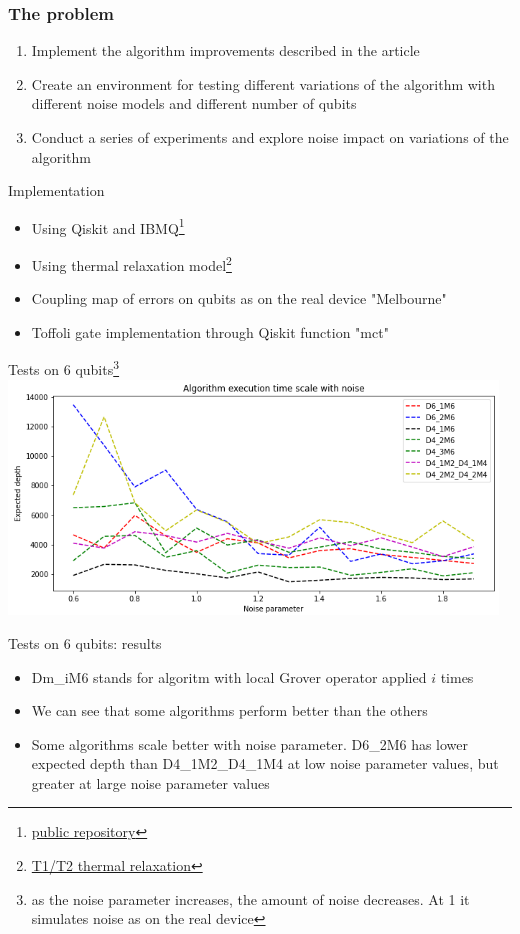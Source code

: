 \documentclass[14pt,aspectratio=169,hyperref={pdftex,unicode},xcolor=dvipsnames]{beamer}
\begin{document}
\begin{frame}
\frametitle{The problem}
\begin{enumerate}
\item Implement the algorithm improvements described in the article
\item Create an environment for testing different variations of the algorithm with different noise models and different number of qubits
\item Conduct a series of experiments and explore noise impact on variations of the algorithm
\end{enumerate}
\end{frame}

\begin{frame}{Implementation}
	\begin{itemize}
		\item Using Qiskit and IBMQ\footnote{\href{https://github.com/StudioShader/QPSA}{public repository}}
		\item Using thermal relaxation  model\footnote{\href{https://github.com/Qiskit/qiskit-tutorials/blob/master/tutorials/simulators/3_building_noise_models.ipynb}{T1/T2 thermal relaxation}}
		\item Coupling map of errors on qubits as on the real device "Melbourne"
		\item Toffoli gate implementation through Qiskit function "mct"
	\end{itemize}
\end{frame}

\begin{frame}{Tests on 6 qubits\footnote{as the noise parameter increases, the amount of noise decreases. At 1 it simulates noise as on the real device}}
	\includegraphics[width=13cm]{images/6_qubit_tests_.png}
\end{frame}

\begin{frame}{Tests on 6 qubits: results}
	\begin{itemize}
		\item Dm\_iM6 stands for algoritm with local Grover operator applied $i$ times
		\item We can see that some algorithms perform better than the others
		\item Some algorithms scale better with noise parameter. D6\_2M6 has lower expected depth than D4\_1M2\_D4\_1M4 at low noise parameter values, but greater at large noise parameter values
	\end{itemize}
\end{frame}
\end{document}
